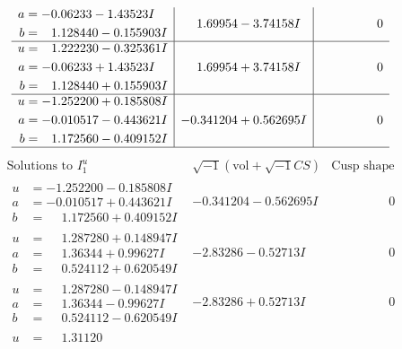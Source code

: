 \documentclass[1p]{elsarticle_modified}
\theoremstyle{definition}
\newcommand{\I}{\sqrt{-1}}
\begin{document}
$$\begin{array}{c|c|c}
\begin{aligned}
a &= -0.06233 - 1.43523 I \\
b &= \phantom{-}1.128440 - 0.155903 I\end{aligned}
 & \phantom{-}1.69954 - 3.74158 I & \phantom{-0.000000 } 0 \\ \hline\begin{aligned}
u &= \phantom{-}1.222230 - 0.325361 I \\
a &= -0.06233 + 1.43523 I \\
b &= \phantom{-}1.128440 + 0.155903 I\end{aligned}
 & \phantom{-}1.69954 + 3.74158 I & \phantom{-0.000000 } 0 \\ \hline\begin{aligned}
u &= -1.252200 + 0.185808 I \\
a &= -0.010517 - 0.443621 I \\
b &= \phantom{-}1.172560 - 0.409152 I\end{aligned}
 & -0.341204 + 0.562695 I & \phantom{-0.000000 } 0\\
 \hline 
 \end{array}$$\newpage$$\begin{array}{c|c|c}  
\text{Solutions to }I^u_{1}& \I (\text{vol} + \sqrt{-1}CS) & \text{Cusp shape}\\
 \hline 
\begin{aligned}
u &= -1.252200 - 0.185808 I \\
a &= -0.010517 + 0.443621 I \\
b &= \phantom{-}1.172560 + 0.409152 I\end{aligned}
 & -0.341204 - 0.562695 I & \phantom{-0.000000 } 0 \\ \hline\begin{aligned}
u &= \phantom{-}1.287280 + 0.148947 I \\
a &= \phantom{-}1.36344 + 0.99627 I \\
b &= \phantom{-}0.524112 + 0.620549 I\end{aligned}
 & -2.83286 - 0.52713 I & \phantom{-0.000000 } 0 \\ \hline\begin{aligned}
u &= \phantom{-}1.287280 - 0.148947 I \\
a &= \phantom{-}1.36344 - 0.99627 I \\
b &= \phantom{-}0.524112 - 0.620549 I\end{aligned}
 & -2.83286 + 0.52713 I & \phantom{-0.000000 } 0 \\ \hline\begin{aligned}
u &= \phantom{-}1.31120\phantom{ +0.000000I} \\

\end{aligned}
\end{array}$$
\end{document}
